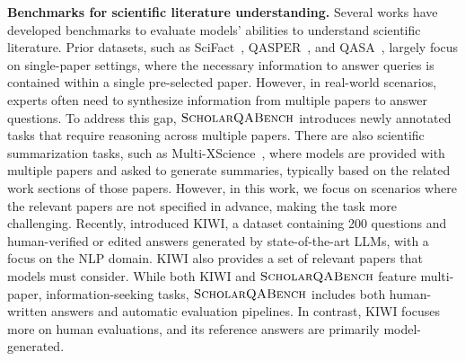 \documentclass{article} %
\newcommand{\data}{$\textsc{ScholarQABench}$\xspace}
\renewcommand{\paragraph}[1]{\noindent \textbf{#1}}
\begin{document}
\paragraph{Benchmarks for scientific literature understanding.}
Several works have developed benchmarks to evaluate models' abilities to understand scientific literature. Prior datasets, such as SciFact~\citep{wadden-etal-2020-fact}, QASPER~\citep{dasigi-etal-2021-dataset}, and QASA~\citep{lee2023qasa}, largely focus on single-paper settings, where the necessary information to answer queries is contained within a single pre-selected paper. However, in real-world scenarios, experts often need to synthesize information from multiple papers to answer questions. To address this gap, \data introduces newly annotated tasks that require reasoning across multiple papers.
There are also scientific summarization tasks, such as Multi-XScience~\citep{lu2020multi}, where models are provided with multiple papers and asked to generate summaries, typically based on the related work sections of those papers. However, in this work, we focus on scenarios where the relevant papers are not specified in advance, making the task more challenging. 
Recently, \citet{xu-etal-2024-kiwi} introduced KIWI, a dataset containing 200 questions and human-verified or edited answers generated by state-of-the-art LLMs, with a focus on the NLP domain. KIWI also provides a set of relevant papers that models must consider. While both KIWI and \data feature multi-paper, information-seeking tasks, \data includes both human-written answers and automatic evaluation pipelines. In contrast, KIWI focuses more on human evaluations, and its reference answers are primarily model-generated.




\end{document}
